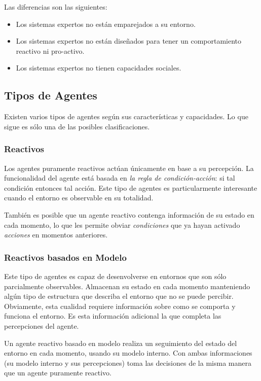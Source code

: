 Las diferencias son las siguientes:

\begin{itemize}
 \item Los sistemas expertos no están emparejados a su entorno.
 \item Los sistemas expertos no están diseñados para tener un comportamiento
 reactivo ni pro-activo.
 \item Los sistemas expertos no tienen capacidades sociales.
\end{itemize}


\subsection*{Tipos de Agentes}

Existen varios tipos de agentes según sus características y capacidades. Lo que
sigue es sólo una de las posibles clasificaciones.

\subsubsection*{Reactivos}

Los agentes puramente reactivos actúan únicamente en base a su percepción. La
funcionalidad del agente está basada en {\em la regla de condición-acción}: si
tal condición entonces tal acción. Este tipo de agentes es particularmente
interesante cuando el entorno es observable en su totalidad.

También es posible que un agente reactivo contenga información de su estado en
cada momento, lo que les permite obviar {\em condiciones} que ya hayan activado
{\em acciones} en momentos anteriores.

\subsubsection*{Reactivos basados en Modelo}

Este tipo de agentes es capaz de desenvolverse en entornos que son sólo
parcialmente observables. Almacenan su estado en cada momento manteniendo algún
tipo de estructura que describa el entorno que no se puede percibir.
Obviamente, esta cualidad requiere información sobre como se comporta y
funciona el entorno. Es esta información adicional la que completa las
percepciones del agente.

Un agente reactivo basado en modelo realiza un seguimiento del estado del
entorno en cada momento, usando su modelo interno. Con ambas informaciones (su
modelo interno y sus percepciones) toma las decisiones de la misma manera que un
agente puramente reactivo.

